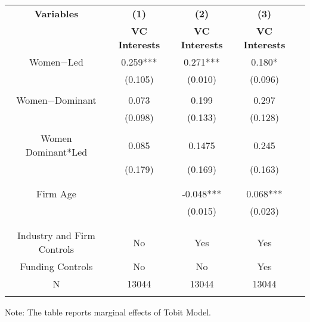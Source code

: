  \begin{table}[htbp]
    \begin{tabular}{c c c c c}
    \toprule
    \textbf{Variables} & \textbf{(1)} & \textbf{(2)} & \textbf{(3)}         \\ 
    \textbf & \textbf{VC Interests} & \textbf{VC Interests} & \textbf{VC Interests}   \\ 

    \midrule
    Women$-$Led         &   0.259*** &     0.271***    &        0.180*   \\
                        &   (0.105)  &      (0.010)    &        (0.096)  \\
                        &             &                &                  \\
    Women$-$Dominant    &    0.073    &      0.199     &        0.297  \\
                        &    (0.098)  &      (0.133)   &        (0.128)  \\
                        &             &                &                    \\
Women Dominant*Led      &    0.085     &    0.1475     &       0.245   \\
                        &   (0.179)   &     (0.169)    &      (0.163)  \\                    
                        &             &                &             \\
                        &             &                &                    \\
    Firm Age            &             &      -0.048*** &    0.068***        \\
                        &             &      (0.015)   &    (0.023)       \\
                        &             &                &                 \\
                        &             &                &                \\

Industry and Firm Controls   &   No        &   Yes       &          Yes    \\
    Funding Controls    &   No             &   No        &        Yes        \\

    \midrule
     N                  &   13044          &      13044  &     13044      \\          
    \bottomrule
  
    \addlinespace[1ex]
    \multicolumn{3}{l}{\textsuperscript{***}$p<0.01$, 
      \textsuperscript{**}$p<0.05$, 
      \textsuperscript{*}$p<0.1$}

\end{tabular}
Note: The table reports marginal effects of Tobit Model.

\end{table}
